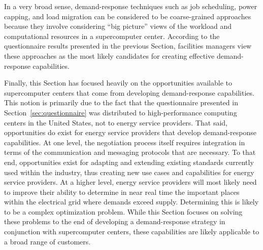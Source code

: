 In a very broad sense, demand-response techniques such as job
scheduling, power capping, and load migration can be considered to
be coarse-grained approaches because they involve considering ``big
picture'' views of the workload and computational resources in a
supercomputer center.  According to the questionnaire results
presented in the previous Section, facilities managers view these
approaches as the most likely candidates for creating effective
demand-response capabilities.

Finally, this Section has focused heavily on the opportunities available
to supercomputer centers that come from developing demand-response
capabilities.  This notion is primarily due to the fact that the
questionnaire presented in Section~\ref{sec:questionnaire} was
distributed to high-performance computing centers in the United
States, not to energy service providers.  That said, opportunities do
exist for energy service providers that develop demand-response
capabilities.  At one level, the negotiation process itself requires
integration in terms of the communication and messaging protocols that
are necessary.  To that end, opportunities exist for adapting and extending
existing standards currently used within the industry, thus creating new
use cases and capabilities for energy service providers.  At a higher
level, energy service providers will most likely need to improve their
ability to determine in near real time the important places within the
electrical grid where demands exceed supply.  Determining this is likely
to be a complex optimization problem.  While this Section focuses on
solving these problems to the end of developing a demand-response
strategy in conjunction with supercomputer centers, these capabilities
are likely applicable to a broad range of customers.
